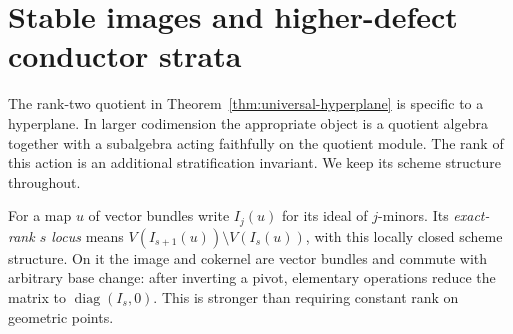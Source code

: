 \section{Stable images and higher-defect conductor strata}
\label{sec:higher-defect}
The rank-two quotient in Theorem~\ref{thm:universal-hyperplane}
is specific to a hyperplane. In larger codimension the appropriate
object is a quotient algebra together with a subalgebra acting faithfully
on the quotient module. The rank of this action is an additional
stratification invariant. We keep its scheme structure throughout.

For a map $u$ of vector bundles write $I_j(u)$ for its ideal of
$j$-minors. Its \emph{exact-rank $s$ locus} means
$V(I_{s+1}(u))\setminus V(I_s(u))$, with this locally closed scheme
structure. On it the image and cokernel are vector bundles and commute
with arbitrary base change: after inverting a pivot, elementary
operations reduce the matrix to $\operatorname{diag}(I_s,0)$.
This is stronger than requiring constant rank on geometric points.

